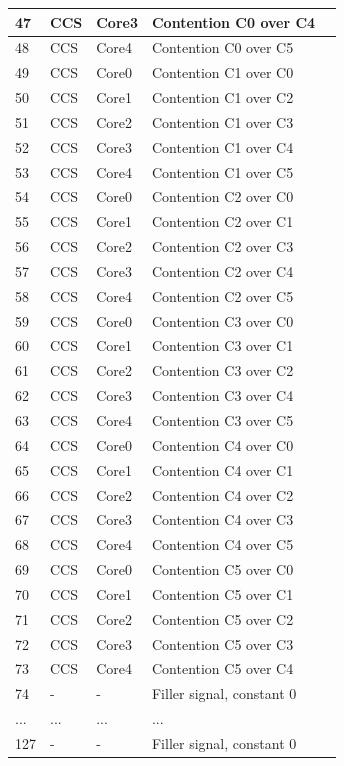 \begin{table}[H]
\begin{tiny}
\begin{tabular}{|l|l|l|l|l|}
			\hline 
			47 & CCS & Core3 &  Contention C0 over C4\\
			\hline 
			48 & CCS & Core4 &  Contention C0 over C5\\
			\hline 
			49 & CCS & Core0 &  Contention C1 over C0\\
			\hline 
			50 & CCS & Core1 &  Contention C1 over C2\\
			\hline 
			51 & CCS & Core2 &  Contention C1 over C3\\
			\hline 
			52 & CCS & Core3 &  Contention C1 over C4\\
			\hline 
			53 & CCS & Core4 &  Contention C1 over C5\\
			\hline 
			54 & CCS & Core0 &  Contention C2 over C0\\
			\hline 
			55 & CCS & Core1 &  Contention C2 over C1\\
			\hline 
			56 & CCS & Core2 &  Contention C2 over C3\\
			\hline 
			57 & CCS & Core3 &  Contention C2 over C4\\
			\hline 
			58 & CCS & Core4 &  Contention C2 over C5\\
			\hline 
			59 & CCS & Core0 &  Contention C3 over C0\\
			\hline 
			60 & CCS & Core1 &  Contention C3 over C1\\
			\hline 
			61 & CCS & Core2 &  Contention C3 over C2\\
			\hline 
			62 & CCS & Core3 &  Contention C3 over C4\\
			\hline 
			63 & CCS & Core4 &  Contention C3 over C5\\
			\hline 
			64 & CCS & Core0 &  Contention C4 over C0\\
			\hline 
			65 & CCS & Core1 &  Contention C4 over C1\\
			\hline 
			66 & CCS & Core2 &  Contention C4 over C2\\
			\hline 
			67 & CCS & Core3 &  Contention C4 over C3\\
			\hline 
			68 & CCS & Core4 &  Contention C4 over C5\\
			\hline 
			69 & CCS & Core0 &  Contention C5 over C0\\
			\hline 
			70 & CCS & Core1 &  Contention C5 over C1\\
			\hline 
			71 & CCS & Core2 &  Contention C5 over C2\\
			\hline 
			72 & CCS & Core3 &  Contention C5 over C3\\
			\hline 
			73 & CCS & Core4 &  Contention C5 over C4\\
			\hline 
			74 & - & - &   Filler signal, constant 0 \\
			\hline 
			... & ... & ... & ... \\
			\hline 
			127 & - & - &   Filler signal, constant 0 \\
			\hline 	
		\end{tabular}
	\end{tiny}
\end{table}
